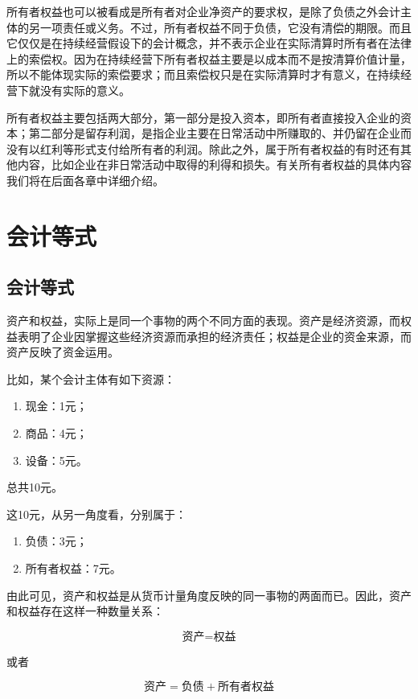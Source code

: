 \begin{enumerate}
					所有者权益也可以被看成是所有者对企业净资产的要求权，是除了负债之外会计主体的另一项责任或义务。不过，所有者权益不同于负债，它没有清偿的期限。而且它仅仅是在持续经营假设下的会计概念，并不表示企业在实际清算时所有者在法律上的索偿权。因为在持续经营下所有者权益主要是以成本而不是按清算价值计量，所以不能体现实际的索偿要求；而且索偿权只是在实际清算时才有意义，在持续经营下就没有实际的意义。
					
					所有者权益主要包括两大部分，第一部分是投入资本，即所有者直接投入企业的资本；第二部分是留存利润，是指企业主要在日常活动中所赚取的、并仍留在企业而没有以红利等形式支付给所有者的利润。除此之外，属于所有者权益的有时还有其他内容，比如企业在非日常活动中取得的利得和损失。有关所有者权益的具体内容我们将在后面各章中详细介绍。
			\end{enumerate}

	\section{会计等式}
		\subsection{会计等式}
		资产和权益，实际上是同一个事物的两个不同方面的表现。资产是经济资源，而权益表明了企业因掌握这些经济资源而承担的经济责任；权益是企业的资金来源，而资产反映了资金运用。
		
		比如，某个会计主体有如下资源：

		\begin{enumerate}
			\item 现金：1元；
			\item 商品：4元；
			\item 设备：5元。
		\end{enumerate}
		
		总共10元。
		
		这10元，从另一角度看，分别属于：
		
		\begin{enumerate}
			\item 负债：3元；
			\item 所有者权益：7元。
		\end{enumerate}
		
		由此可见，资产和权益是从货币计量角度反映的同一事物的两面而已。因此，资产和权益存在这样一种数量关系：

		$$\text{资产}=\text{权益}$$

		或者
		
		$$\text{资产} = \text{负债} + \text{所有者权益}$$
		
